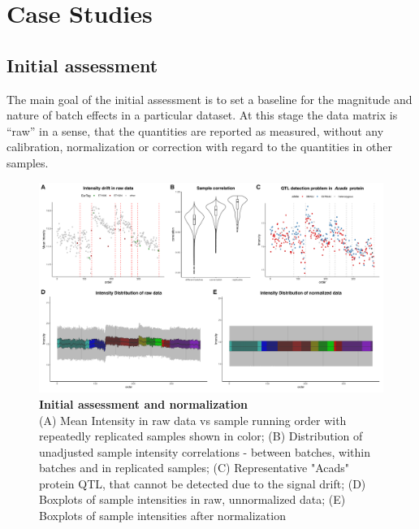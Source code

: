\documentclass[num-refs]{wiley-article}
\begin{document}
\section{Case Studies}\label{subsec:case_studies}
\subsection{Initial assessment}
The main goal of the initial assessment is to set a baseline for the magnitude and nature of batch effects in a particular dataset. At this stage the data matrix is “raw” in a sense, that the quantities are reported as measured, without any calibration, normalization or correction with regard to the quantities in other samples.


\begin{figure}[hbt]
	\includegraphics[width=\textwidth]{figures/Fig1_initial_assessment_v5_edited.pdf}
	
	\caption{\textbf{Initial assessment and normalization} \\
		\footnotesize
		(A) Mean Intensity in raw data vs sample running order with repeatedly replicated samples shown in color; (B) Distribution of unadjusted sample intensity correlations - between batches, within batches and in replicated samples; (C) Representative "Acads" protein QTL, that cannot be detected due to the signal drift; (D) Boxplots of sample intensities in raw, unnormalized data; (E) Boxplots of sample intensities after normalization}
	\label{fig:batch_fig2_initAssessment}
\end{figure}
\end{document}
